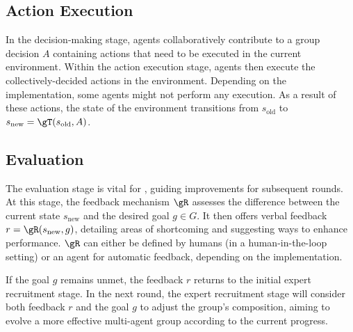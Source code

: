 \subsection{Action Execution}
\label{sec:method-execution}


In the decision-making stage, agents collaboratively contribute to a group decision $A$ containing actions that need to be executed in the current environment. Within the action execution stage, agents then execute the collectively-decided actions in the environment. Depending on the implementation, some agents might not perform any execution. As a result of these actions, the state of the environment transitions from $s_\text{old}$ to $s_\text{new}=\gT(s_\text{old}, A)$.


\subsection{Evaluation}
\label{sec:method-feedback}

The evaluation stage is vital for \framework, guiding improvements for subsequent rounds. At this stage, the feedback mechanism $\gR$ assesses the difference between the current state $s_\text{new}$ and the desired goal $g \in G$. It then offers verbal feedback $r=\gR(s_\text{new}, g)$, detailing areas of shortcoming and suggesting ways to enhance performance. $\gR$ can either be defined by humans (in a human-in-the-loop \citep{Amershi_Cakmak_Knox_Kulesza_2014} setting) or an agent for automatic feedback, depending on the implementation.

If the goal $g$ remains unmet, the feedback $r$ returns to the initial expert recruitment stage. In the next round, the expert recruitment stage will consider both feedback $r$ and the goal $g$ to adjust the group's composition, aiming to evolve a more effective multi-agent group according to the current progress.
